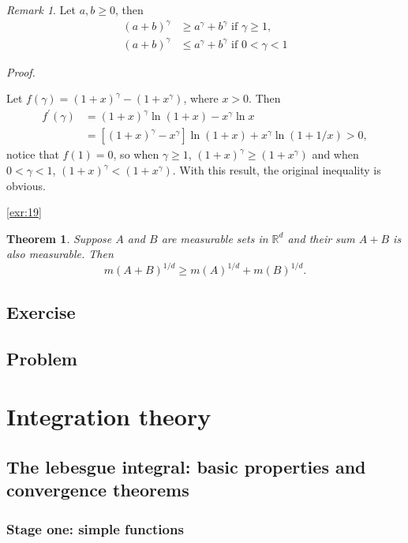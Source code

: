 \documentclass[
]{book}
\newtheorem{theorem}{Theorem}[chapter]
\theoremstyle{definition}
\theoremstyle{definition}
\theoremstyle{definition}
\theoremstyle{definition}
\theoremstyle{remark}
\newtheorem*{remark}{Remark}
\begin{document}
\begin{remark}
\leavevmode

Let \(a,b\ge0\), then
\[
\begin{aligned}
(a+b)^\gamma&\ge a^\gamma+b^\gamma\text{ if }\gamma\ge 1,\\
(a+b)^\gamma&\le a^\gamma+b^\gamma\text{ if }0<\gamma< 1
\end{aligned}
\]

\emph{Proof.}

Let \(f(\gamma)=(1+x)^\gamma-(1+x^\gamma)\), where \(x> 0\). Then
\[
\begin{aligned}
f^\prime (\gamma)&=(1+x)^\gamma\ln(1+x)-x^\gamma\ln x\\
&=[(1+x)^\gamma-x^\gamma]\ln(1+x)+x^\gamma\ln(1+1/x)>0,
\end{aligned}
\]
notice that \(f(1)=0\), so when \(\gamma\ge 1\), \((1+x)^\gamma\ge(1+x^\gamma)\) and when \(0<\gamma< 1\), \((1+x)^\gamma<(1+x^\gamma)\). With this result, the original inequality is obvious.

\end{remark}

\ref{exr:19}

\begin{theorem}
Suppose \(A\) and \(B\) are measurable sets in \(\mathbb{R}^d\) and their sum \(A+B\) is also measurable. Then
\[
m(A+B)^{1/d}\ge m(A)^{1/d}+m(B)^{1/d}.
\]
\end{theorem}

\section{Exercise}\label{exercise}

\section{Problem}\label{problem}

\chapter{Integration theory}\label{ch2}

\section{The lebesgue integral: basic properties and convergence theorems}\label{the-lebesgue-integral-basic-properties-and-convergence-theorems}

\subsection{Stage one: simple functions}\label{stage-one-simple-functions}
\end{document}
